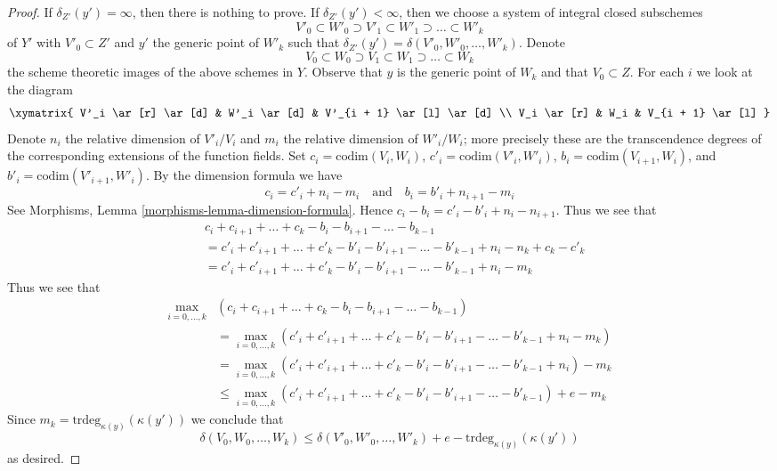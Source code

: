 \documentclass[10pt,a4paper]{amsart}
\theoremstyle{plain}
\theoremstyle{definition}
\theoremstyle{remark}
\numberwithin{equation}{subsection}
\begin{document}
\begin{proof}
If $\delta_{Z'}(y') = \infty$, then there is nothing to prove.
If $\delta_{Z'}(y') < \infty$, then we choose a system
of integral closed subschemes
$$
V'_0 \subset W'_0 \supset V'_1 \subset W'_1 \supset \ldots \subset W'_k
$$
of $Y'$ with $V'_0 \subset Z'$ and $y'$ the generic point of $W'_k$
such that $\delta_{Z'}(y') = \delta(V'_0, W'_0, \ldots, W'_k)$.
Denote
$$
V_0 \subset W_0 \supset V_1 \subset W_1 \supset \ldots \subset W_k
$$
the scheme theoretic images of the above schemes in $Y$. Observe
that $y$ is the generic point of $W_k$ and that $V_0 \subset Z$.
For each $i$ we look at the diagram
$$
\xymatrix{
V'_i \ar[r] \ar[d] & W'_i \ar[d] & V'_{i + 1} \ar[l] \ar[d] \\
V_i \ar[r] & W_i & V_{i + 1} \ar[l]
}
$$
Denote $n_i$ the relative dimension of $V'_i/V_i$ and
$m_i$ the relative dimension of $W'_i/W_i$; more precisely
these are the transcendence degrees of the corresponding extensions of
the function fields. Set
$c_i = \text{codim}(V_i, W_i)$,
$c'_i = \text{codim}(V'_i, W'_i)$,
$b_i = \text{codim}(V_{i + 1}, W_i)$, and
$b'_i = \text{codim}(V'_{i + 1}, W'_i)$.
By the dimension formula we have
$$
c_i = c'_i + n_i - m_i
\quad\text{and}\quad
b_i = b'_i + n_{i + 1} - m_i
$$
See Morphisms, Lemma \ref{morphisms-lemma-dimension-formula}.
Hence $c_i - b_i = c'_i - b'_i + n_i - n_{i + 1}$. Thus we see that
\begin{align*}
& c_i + c_{i + 1} + \ldots + c_k - b_i - b_{i + 1} - \ldots - b_{k - 1} \\
& =
c'_i + c'_{i + 1} + \ldots + c'_k - b'_i - b'_{i + 1} - \ldots - b'_{k - 1}
+ n_i - n_k + c_k - c'_k \\
& =
c'_i + c'_{i + 1} + \ldots + c'_k - b'_i - b'_{i + 1} - \ldots - b'_{k - 1}
+ n_i - m_k
\end{align*}
Thus we see that
\begin{align*}
\max_{i = 0, \ldots, k}
& (c_i + c_{i + 1} + \ldots + c_k - b_i - b_{i + 1} - \ldots - b_{k - 1}) \\
& =
\max_{i = 0, \ldots, k}
(c'_i + c'_{i + 1} + \ldots + c'_k - b'_i - b'_{i + 1} - \ldots - b'_{k - 1}
+ n_i - m_k) \\
& =
\max_{i = 0, \ldots, k}
(c'_i + c'_{i + 1} + \ldots + c'_k - b'_i - b'_{i + 1} - \ldots - b'_{k - 1}
+ n_i) - m_k \\
& \leq
\max_{i = 0, \ldots, k}
(c'_i + c'_{i + 1} + \ldots + c'_k - b'_i - b'_{i + 1} - \ldots - b'_{k - 1})
+ e - m_k
\end{align*}
Since $m_k = \text{trdeg}_{\kappa(y)}(\kappa(y'))$ we conclude that
$$
\delta(V_0, W_0, \ldots, W_k) \leq
\delta(V'_0, W'_0, \ldots, W'_k) + e - \text{trdeg}_{\kappa(y)}(\kappa(y'))
$$
as desired.
\end{proof}
\end{document}
